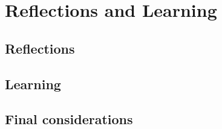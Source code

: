 \chapter{Reflections and Learning}
\label{chap:reflectionsandlearning}
\section{Reflections}
\section{Learning}
\section{Final considerations} 
